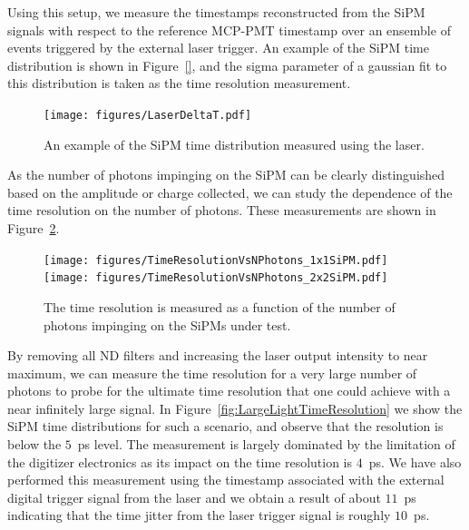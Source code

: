 Using this setup, we measure the timestamps reconstructed from the SiPM signals with respect
to the reference MCP-PMT timestamp over an ensemble of events triggered 
by the external laser trigger. An example of the SiPM time distribution is shown 
in Figure~\ref{}, and the sigma parameter of a gaussian fit to this distribution 
is taken as the time resolution measurement.

\begin{figure}[htbp] 
\centering
\texttt{[image: figures/LaserDeltaT.pdf]} 
\caption{An example of the SiPM time distribution measured using the laser.} 
\label{fig:LaserDeltaT} 
\end{figure} 

As the number of photons impinging on the SiPM can be clearly distinguished 
based on the amplitude or charge collected, we can study the dependence of the 
time resolution on the number of photons. These measurements are shown in 
Figure~\ref{fig:TimeResolutionVsNPhotons}.

\begin{figure}[htbp] 
\centering
\texttt{[image: figures/TimeResolutionVsNPhotons\_1x1SiPM.pdf]} 
\texttt{[image: figures/TimeResolutionVsNPhotons\_2x2SiPM.pdf]} 
\caption{The time resolution is measured as a function of the number of photons impinging on the
SiPMs under test. } 
\label{fig:TimeResolutionVsNPhotons} 
\end{figure} 

By removing all ND filters and increasing the laser output intensity to near 
maximum, we can measure the time resolution for a very large number of photons 
to probe for the ultimate time resolution that one could achieve with a near 
infinitely large signal. In Figure~\ref{fig:LargeLightTimeResolution} we show 
the SiPM time distributions for such a scenario, and observe that the resolution 
is below the $5$~ps level. The measurement is largely dominated by the limitation
of the digitizer electronics as its impact on the time resolution is $4$~ps. We 
have also performed this measurement using the timestamp associated with the 
external digital trigger signal from the laser and we obtain a result of about 
$11$~ps indicating that the time jitter from the laser trigger signal is roughly 
$10$~ps. 



